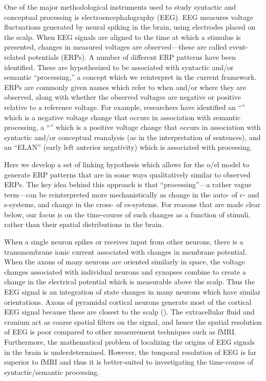 One of the major methodological instruments used to study syntactic and conceptual processing is electroencephalography (EEG). EEG measures voltage fluctuations generated by neural spiking in the brain, using electrodes placed on the scalp. When EEG signals are aligned to the time at which a stimulus is presented, changes in measured voltages are observed—these are called event-related potentials (ERPs). A number of different ERP patterns have been identified. These are hypothesized to be associated with syntactic and/or semantic “processing,” a concept which we reinterpret in the current framework. ERPs are commonly given names which refer to when and/or where they are observed, along with whether the observed voltages are negative or positive relative to a reference voltage. For example, researchers have identified an “” which is a negative voltage change that occurs in association with semantic processing, a “” which is a positive voltage change that occurs in association with syntactic and/or conceptual reanalysis (as in the interpretation of  sentences), and an “ELAN” (early left anterior negativity) which is associated with  processing. 

Here we develop a set of linking hypothesis which allows for the o/el model to generate ERP patterns that are in some ways qualitatively similar to observed ERPs. The key idea behind this approach is that “processing”—a rather vague term—can be reinterpreted more mechanistically as change in the auto- of c- and s-systems, and change in the cross- of cs-systems. For reasons that are made clear below, our focus is on the time-course of such changes as a function of stimuli, rather than their spatial distributions in the brain.

When a single neuron spikes or receives input from other neurons, there is a transmembrane ionic current associated with changes in membrane potential. When the axons of many neurons are oriented similarly in space, the voltage changes associated with individual neurons and synapses combine to create a change in the electrical potential which is measurable above the scalp. Thus the EEG signal is an integration of state changes in many neurons which have similar orientations. Axons of pyramidal cortical neurons generate most of the cortical EEG signal because these are closest to the scalp (\citealt{FedermeierLaszlo2009,KutasDale1997}). The extracellular fluid and cranium act as coarse spatial filters on the signal, and hence the spatial resolution of EEG is poor compared to other measurement techniques such as fMRI. Furthermore, the mathematical problem of localizing the origins of EEG signals in the brain is underdetermined. However, the temporal resolution of EEG is far superior to fMRI and thus it is better-suited to investigating the time-course of syntactic/semantic processing. 


